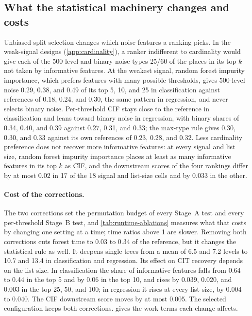 \subsection{What the statistical machinery changes and costs}
\label{sec:results-practical}

Unbiased split selection changes which noise features a ranking picks. In the
weak-signal designs (\cref{app:cardinality}), a ranker indifferent to
cardinality would give each of the 500-level and binary noise types 25/60 of
the places in its top $k$ not taken by informative features. At the weakest signal, random forest impurity importance,
which prefers features with many possible thresholds, gives 500-level noise
0.29, 0.38, and 0.49 of its top 5, 10, and 25 in classification against
references of 0.18, 0.24, and 0.30, the same pattern in regression, and never
selects binary noise. Per-threshold CIF stays close to the reference in
classification and leans toward binary noise in regression, with binary shares
of 0.34, 0.40, and 0.39 against 0.27, 0.31, and 0.33; the max-type rule gives
0.30, 0.30, and 0.33 against its own references of 0.23, 0.28, and 0.32. Less cardinality preference does not recover more
informative features: at every signal and list size, random forest impurity
importance places at least as many informative features in its top $k$ as CIF,
and the downstream scores of the four rankings differ by at most 0.02 in 17 of
the 18 signal and list-size cells and by 0.033 in the other.

\paragraph{Cost of the corrections.}
The two corrections set the permutation budget of every Stage~A test and every
per-threshold Stage~B test, and \cref{tab:runtime-ablations} measures what that
costs by changing one setting at a time; time ratios above 1 are slower.
Removing both corrections cuts
forest time to 0.03 to 0.34 of the reference, but it changes the statistical
rule as well. It deepens single trees from a mean of 6.5 and 7.2 levels to 10.7
and 13.4 in classification and regression. Its effect on CIT recovery depends
on the list size. In classification the share of informative features falls
from 0.64 to 0.44 in the top 5 and by 0.06 in the top 10, and rises by 0.039,
0.020, and 0.003 in the top 25, 50, and 100; in regression it rises at every
list size, by 0.004 to 0.040. The CIF downstream score moves by at
most 0.005. The selected configuration keeps both corrections.
 gives the work terms each change affects.

